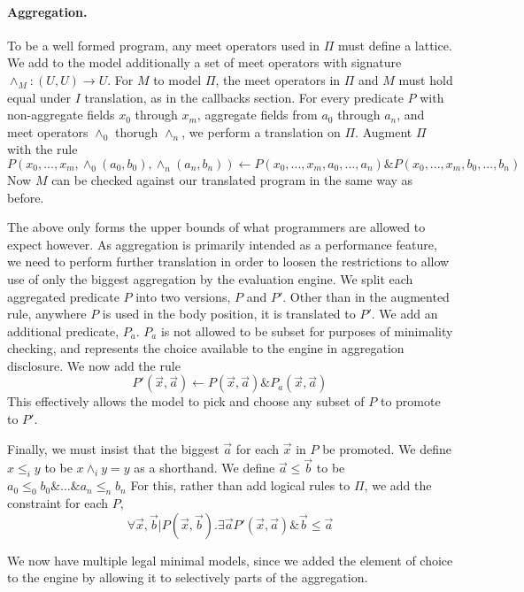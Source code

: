 \paragraph{Aggregation.}
To be a well formed program, any meet operators used in $\Pi$ must define a lattice.
We add to the model additionally a set of meet operators with signature $\wedge_M : (U, U) \rightarrow U$.
For $M$ to model $\Pi$, the meet operators in $\Pi$ and $M$ must hold equal under $I$ translation, as in the callbacks section.
For every predicate $P$ with non-aggregate fields $x_0$ through $x_m$, aggregate fields from $a_0$ through $a_n$, and meet operators $\wedge_0$ thorugh $\wedge_n$, we perform a translation on $\Pi$.
Augment $\Pi$ with the rule
\[P(x_0, ..., x_m, \wedge_0(a_0, b_0), \wedge_n(a_n, b_n)) \leftarrow P(x_0, ..., x_m, a_0, ..., a_n) \& P(x_0, ..., x_m, b_0, ..., b_n)\]
Now $M$ can be checked against our translated program in the same way as before.

The above only forms the upper bounds of what programmers are allowed to expect however.
As aggregation is primarily intended as a performance feature, we need to perform further translation in order to loosen the restrictions to allow use of only the biggest aggregation by the evaluation engine.
We split each aggregated predicate $P$ into two versions, $P$ and $P'$.
Other than in the augmented rule, anywhere $P$ is used in the body position, it is translated to $P'$.
We add an additional predicate, $P_a$.
$P_a$ is not allowed to be subset for purposes of minimality checking, and represents the choice available to the engine in aggregation disclosure.
We now add the rule
\[P'(\vec{x}, \vec{a}) \leftarrow P(\vec{x}, \vec{a}) \& P_a(\vec{x}, \vec{a})\]
This effectively allows the model to pick and choose any subset of $P$ to promote to $P'$.

Finally, we must insist that the biggest $\vec{a}$ for each $\vec{x}$ in $P$ be promoted. 
We define $x \leq_i y$ to be $x \wedge_i y = y$ as a shorthand.
We define $\vec{a} \leq \vec{b}$ to be $a_0 \leq_0 b_0 \& ... \& a_n \leq_n b_n$
For this, rather than add logical rules to $\Pi$, we add the constraint for each $P$,
\[
	\forall \vec{x}, \vec{b} | P(\vec{x}, \vec{b}). \exists \vec{a} P'(\vec{x}, \vec{a}) \& \vec{b} \leq \vec{a}
\]

We now have multiple legal minimal models, since we added the element of choice to the engine by allowing it to selectively parts of the aggregation.

